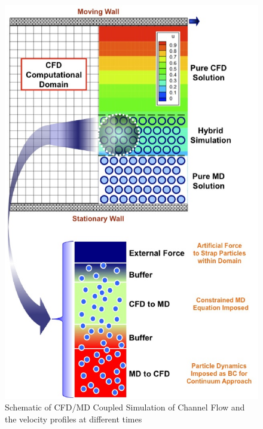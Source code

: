 \documentclass[conference,final]{IEEEtran}
\begin{document}
\begin{figure}
\centering
\includegraphics[scale=0.33]{fig1.eps}
\caption{\small Schematic of CFD/MD Coupled Simulation of Channel Flow
  and the velocity profiles at different times}
\label{Fig:Couette}
\vspace{-1em}
\end{figure}
\end{document}
